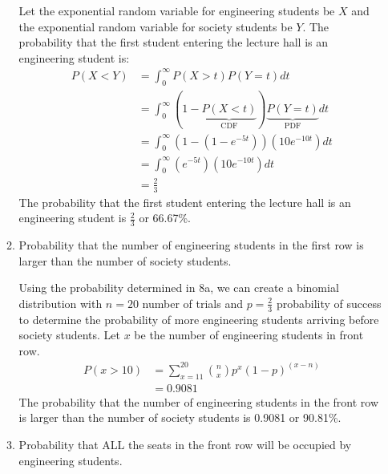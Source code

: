 \documentclass[12pt]{article}
\begin{document}
\begin{enumerate}
\begin{enumerate}
        Let the exponential random variable for engineering students be $X$ and the exponential random variable for society students be $Y$. The probability that the first student entering the lecture hall is an engineering student is: 
        \begin{equation*}
        \begin{aligned}
            P(X < Y) &= \int_0^{\infty} P(X > t) P(Y = t) dt \\
            &= \int_0^{\infty} (1-\underbrace{P(X < t)}_{\text{CDF}}) \underbrace{P(Y = t)}_{\text{PDF}} dt \\
            &= \int_0^{\infty} (1-(1-e^{-5t}))(10e^{-10t}) dt \\
            &= \int_0^{\infty} (e^{-5t})(10e^{-10t}) dt \\
            &= \frac{2}{3}
        \end{aligned}
        \end{equation*}
        The probability that the first student entering the lecture hall is an engineering student is $\frac{2}{3}$ or 66.67\%.

        \item Probability that the number of engineering students in the first row is larger than the number of society students.

        Using the probability determined in 8a, we can create a binomial distribution with $n = 20$ number of trials and $p = \frac{2}{3}$ probability of success to determine the probability of more engineering students arriving before society students. Let $x$ be the number of engineering students in front row.
        \begin{equation*}
        \begin{aligned}
            P(x > 10) &= \sum_{x=11}^{20} \binom{n}{x} p^x (1-p)^{(x-n)} \\
            &= 0.9081
        \end{aligned}
        \end{equation*}
        The probability that the number of engineering students in the front row is larger than the number of society students is 0.9081 or 90.81\%.
        
        \item Probability that ALL the seats in the front row will be occupied by engineering students.


\end{enumerate}
\end{enumerate}
\end{document}
